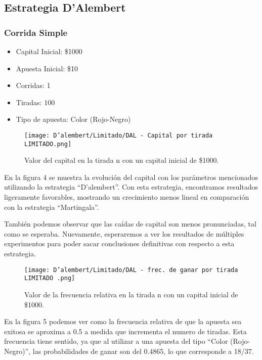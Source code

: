 \documentclass{article}
\begin{document}
\subsection{Estrategia D’Alembert}
\subsubsection{Corrida Simple}

\begin{itemize}[noitemsep]
\item Capital Inicial: \$1000
\item Apuesta Inicial: \$10
\item Corridas: 1
\item Tiradas: 100
\item Tipo de apuesta: Color (Rojo-Negro)
\end{itemize}

 \begin{figure} [H]
        \centering
            \texttt{[image: D'alembert/Limitado/DAL - Capital por tirada LIMITADO.png]}
            \caption{Valor del capital en la tirada n con un capital inicial de \$1000.}
            \label{fig:grafico}
    \end{figure}

En la figura 4 se muestra la evolución del capital con los parámetros mencionados utilizando la estrategia ``D'alembert''. Con esta estrategia, encontramos resultados ligeramente favorables, mostrando un crecimiento menos lineal en comparación con la estrategia ``Martingala''.

También podemos observar que las caídas de capital son menos pronunciadas, tal como se esperaba. Nuevamente, esperaremos a ver los resultados de múltiples experimentos para poder sacar conclusiones definitivas con respecto a esta estrategia.

 \begin{figure} [H]
        \centering
            \texttt{[image: D'alembert/Limitado/DAL - frec. de ganar por tirada LIMITADO .png]}
            \caption{Valor de la frecuencia relativa en la tirada n con un capital inicial de \$1000.}
            \label{fig:grafico}
    \end{figure}
    
En la figura 5 podemos ver como la frecuencia relativa de que la apuesta sea exitosa se aproxima a 0.5 a medida que incrementa el numero de tiradas. Esta frecuencia tiene sentido, ya que al utilizar a una apuesta del tipo ``Color (Rojo-Negro)'', las probabilidades de ganar son del 0.4865, lo que corresponde a 18/37.
\end{document}
